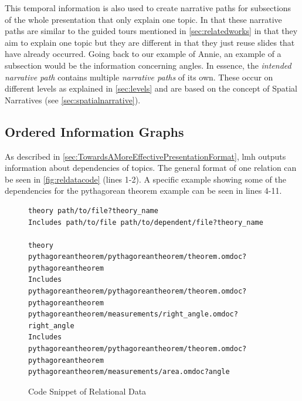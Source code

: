 \documentclass[twoside, 12pt]{article}
\begin{document}
This temporal information is also used to create narrative paths for subsections of the whole presentation that only explain one topic. In that these narrative paths are similar to the guided tours mentioned in \autoref{sec:relatedworks} in that they aim to explain one topic but they are different in that they just reuse slides that have already occurred. Going back to our example of Annie, an example of a subsection would be the information concerning angles. In essence, the \textit{intended narrative path} contains multiple \textit{narrative paths} of its own. These occur on different levels as explained in \autoref{sec:levels} and are based on the concept of Spatial Narratives (see \autoref{sec:spatialnarrative}).\\

\subsection{Ordered Information Graphs}
\label{sec:orderedInfoGraphs}

As described in \autoref{sec:TowardsAMoreEffectivePresentationFormat}, lmh outputs information about dependencies of topics. The general format of one relation can be seen in \autoref{fig:reldatacode} (lines 1-2). A specific example showing some of the dependencies for the pythagorean theorem example can be seen in lines 4-11.\\

\begin{figure}
\vspace{-26pt}
\begin{verbatim}
theory path/to/file?theory_name
Includes path/to/file path/to/dependent/file?theory_name

theory 
pythagoreantheorem/pythagoreantheorem/theorem.omdoc?pythagoreantheorem
Includes 
pythagoreantheorem/pythagoreantheorem/theorem.omdoc?pythagoreantheorem
pythagoreantheorem/measurements/right_angle.omdoc?right_angle
Includes 
pythagoreantheorem/pythagoreantheorem/theorem.omdoc?pythagoreantheorem
pythagoreantheorem/measurements/area.omdoc?angle
\end{verbatim}
\vspace{-5pt}
  \caption[Caption for LOF]{Code Snippet of Relational Data \footnotemark}
  \label{fig:reldatacode}
  \vspace{12pt}
\end{figure}

\begin{figure}
\vspace{-50pt}
\end{figure}
\end{document}
